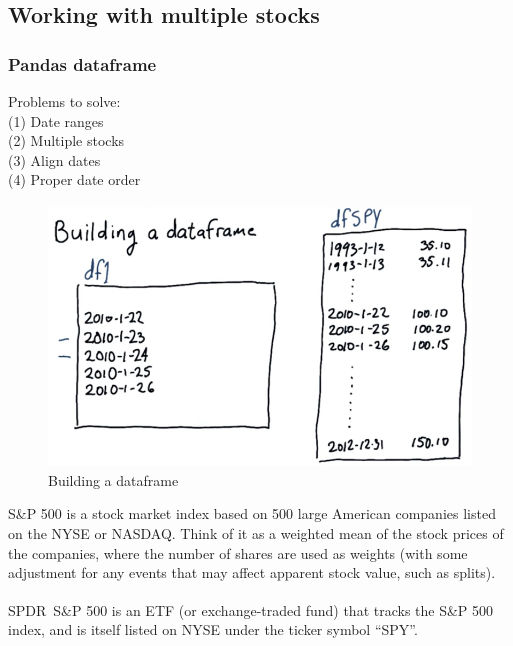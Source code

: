 \documentclass[12pt]{article}
\newcommand{\q}[1]{``#1''}
\begin{document}
\subsection{Working with multiple stocks}

\subsubsection{Pandas dataframe} 

Problems to solve: \\
(1) Date ranges\\
(2) Multiple stocks\\
(3) Align dates\\
(4) Proper date order 

\begin{figure}[!ht]
\centering
\includegraphics[scale=0.45]{fig/fig4}
\caption{Building a dataframe}
\end{figure}

S\&P 500 is a stock market index based on 500 large American companies listed on the NYSE or NASDAQ. Think of it as a weighted mean of the stock prices of the companies, where the number of shares are used as weights (with some adjustment for any events that may affect apparent stock value, such as splits).

SPDR\textsuperscript\textregistered\, S\&P 500 is an ETF (or exchange-traded fund) that tracks the S\&P 500 index, and is itself listed on NYSE under the ticker symbol \q{SPY}.
\end{document}
